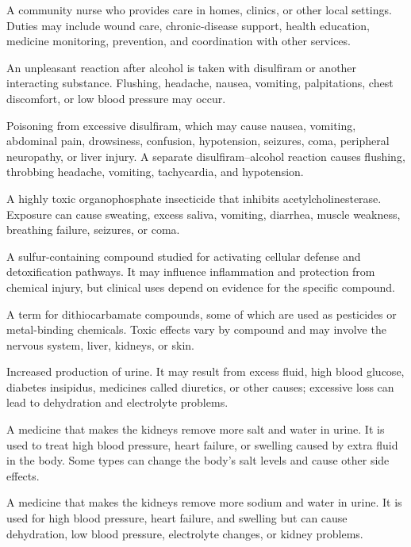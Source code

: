  A community nurse who provides care in homes, clinics, or other local settings. Duties may include wound care, chronic-disease support, health education, medicine monitoring, prevention, and coordination with other services.

 An unpleasant reaction after alcohol is taken with disulfiram or another interacting substance. Flushing, headache, nausea, vomiting, palpitations, chest discomfort, or low blood pressure may occur.

 Poisoning from excessive disulfiram, which may cause nausea, vomiting, abdominal pain, drowsiness, confusion, hypotension, seizures, coma, peripheral neuropathy, or liver injury. A separate disulfiram--alcohol reaction causes flushing, throbbing headache, vomiting, tachycardia, and hypotension.

 A highly toxic organophosphate insecticide that inhibits acetylcholinesterase. Exposure can cause sweating, excess saliva, vomiting, diarrhea, muscle weakness, breathing failure, seizures, or coma.

 A sulfur-containing compound studied for activating cellular defense and detoxification pathways. It may influence inflammation and protection from chemical injury, but clinical uses depend on evidence for the specific compound.

 A term for dithiocarbamate compounds, some of which are used as pesticides or metal-binding chemicals. Toxic effects vary by compound and may involve the nervous system, liver, kidneys, or skin.

 Increased production of urine. It may result from excess fluid, high blood glucose, diabetes insipidus, medicines called diuretics, or other causes; excessive loss can lead to dehydration and electrolyte problems.

 A medicine that makes the kidneys remove more salt and water
in urine. It is used to treat high blood pressure, heart failure, or swelling
caused by extra fluid in the body. Some types can change the body's salt levels
and cause other side effects.

 A medicine that makes the kidneys remove more sodium and water in urine. It is used for high blood pressure, heart failure, and swelling but can cause dehydration, low blood pressure, electrolyte changes, or kidney problems.

